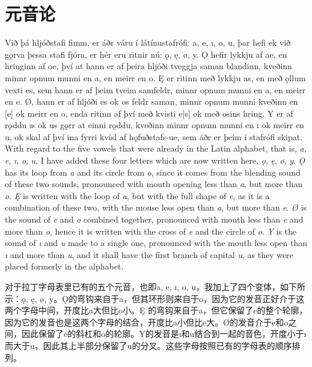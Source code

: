 \section{元音论}
\begin{paracol}{2}
  Við þá hljóðstafi fimm, er áðr váru í látínustafrófi: a, e, ı, o, u, þar hefi ek við gǫrva þessa stafi fjóra, er hér eru ritnir nú: ǫ, ę, ø, y. Ǫ hefir lykkju af ae, en hringinn af oe, því at hann er af þeira hljóði tveggja saman blandinn, kveðinn minnr opnum munni en a, en meirr en o. Ę er ritinn með lykkju as, en með ǫllum vexti es, sem hann er af þeim tveim samfeldr, minnr opnum munni en a, en meirr en e. Ø, hann er af hljóði es ok os feldr saman, minnr opnum munni kveðinn en [e] ok meirr en o, enda ritinn af því með kvisti e[s] ok með osins hring. Y er af rǫddu ıs ok us gǫrr at einni rǫddu, kveðinn minnr opnum munni en ı ok meirr en u, ok skal af því ina fyrri kvísl af hǫfuðstafs-ue, sem áðr er þeim í stafrófi skipat.
  \switchcolumn
  With regard to the five vowels that were already in the Latin alphabet, that is, \textit{a}, \textit{e}, \textit{ı}, \textit{o}, \textit{u}, I have added these four letters which are now written here, \textit{ǫ}, \textit{ę}, \textit{ø}, \textit{y}. \textit{Ǫ} has its loop from \textit{a} and its circle from \textit{o}, since it comes from the blending sound of these two sounds, pronounced with mouth opening less than \textit{a}, but more than \textit{o}. \textit{Ę} is written with the loop of \textit{a}, but with the full shape of \textit{e}, as it is a combination of these two, with the mouse less open than \textit{a}, but more than \textit{e}. \textit{Ø} is the sound of \textit{e} and \textit{o} combined together, pronounced with mouth less than \textit{e} and more than \textit{o}, hence it is written with the cross of \textit{e} and the circle of \textit{o}. \textit{Y} is the sound of \textit{ı} and \textit{u} made to a single one, pronounced with the mouth less open than \textit{ı} and more than \textit{u}, and it shall have the first branch of capital \textit{u}, as they were placed formerly in the alphabet.
\end{paracol}
\begin{translation*}{}
  对于拉丁字母表里已有的五个元音，也即a, e, ı, o, u，我加上了四个变体，如下所示：ǫ, ę, ø, y。Ǫ的弯钩来自于a，但其环形则来自于o，因为它的发音正好介于这两个字母中间，开度比a大但比o小。Ę 的弯钩来自于a，但它保留了e的整个轮廓，因为它的发音也是这两个字母的结合，开度比a小但比e大。Ø的发音介于e和o之间，因此保留了e的斜杠和o的轮廓。Y的发音是ı和u结合到一起的音色，开度小于ı而大于u，因此其上半部分保留了u的分叉。这些字母按照已有的字母表的顺序排列。
\end{translation*}
